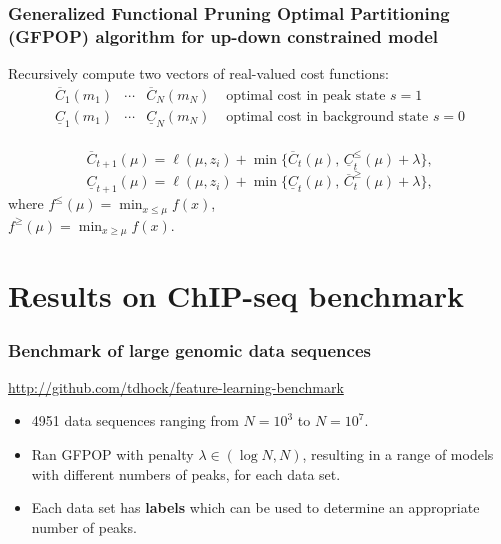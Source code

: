\documentclass{beamer}
\begin{document}
\begin{frame}
  \frametitle{Generalized Functional Pruning Optimal Partitioning
    (GFPOP) algorithm for up-down constrained model}
Recursively compute two vectors of real-valued cost functions:
$$
\begin{array}{cccl}
  \overline C_{1}(m_1) & \cdots & \overline C_N(m_{N})& \text{ optimal cost in peak state $s=1$}\\
  \underline C_{1}(m_1) & \cdots & \underline C_N(m_{N})& \text{ optimal cost in background state $s=0$}\\
\end{array}
$$
\begin{minipage}{0.65\linewidth}
  $$\overline C_{t+1}(\mu) = \ell(\mu, z_i) + \min\{
  \overline C_t(\mu),\, 
  \underline C_t^\leq(\mu)+\lambda
\},$$
  $$\underline C_{t+1}(\mu) = \ell(\mu, z_i) + \min\{
  \underline C_t(\mu),\, 
  \overline C_t^\geq(\mu)+\lambda
\},$$
where $f^\leq(\mu) = \min_{x\leq\mu} f(x)$,\\
$f^\geq(\mu) = \min_{x\geq\mu} f(x)$.
\end{minipage}
\begin{minipage}{0.25\linewidth}
\end{minipage}
\end{frame}

\section{Results on ChIP-seq benchmark}

\begin{frame}
  \frametitle{Benchmark of large genomic data sequences}

\url{http://github.com/tdhock/feature-learning-benchmark}

\begin{itemize}
\item 4951 data sequences ranging from $N=10^3$ to $N=10^7$.
\item Ran GFPOP with penalty $\lambda\in(\log N, N)$, resulting in a
  range of models with different numbers of peaks, for each data set.
\item Each data set has \textbf{labels} which can be used to determine
  an appropriate number of peaks.
\end{itemize}
\end{frame}
\end{document}
